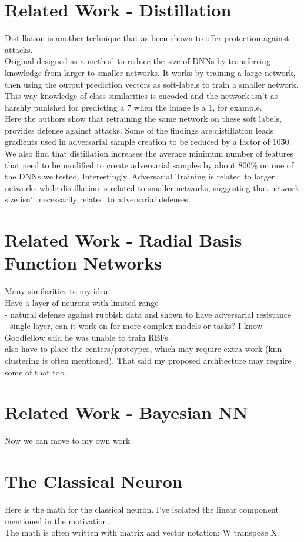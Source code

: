 \documentclass{article}
\begin{document}
\section{Related Work - Distillation}
Distillation is another technique that as been shown to offer protection against attacks.\\
Original designed as a method to reduce the size of DNNs by transferring knowledge from larger to smaller networks. It works by training a large network, then using the output prediction vectors as soft-labels to train a smaller network. This way knowledge of class similarities is encoded and the network isn't as harshly punished for predicting a 7 when the image is a  1, for example.\\
Here the authors show that retraining the same network on these soft labels, provides defense against attacks. Some of the findings are:distillation leads gradients used in adversarial sample creation to be reduced by a factor of
10\^30. We also find that distillation increases the average minimum
number of features that need to be modified to create adversarial
samples by about 800\% on one of the DNNs we tested.
Interestingly, Adversarial Training is related to larger networks while distillation is related to smaller networks, suggesting that network size isn't necessarily related to adversarial defenses.

\section{Related Work - Radial Basis Function Networks}
Many similarities to my idea:\\
Have a layer of neurons with limited range\\
 - natural defense against rubbish data and shown to have adversarial resistance\\
 - single layer, can it work on for more complex models or tasks? I know Goodfellow said he was unable to train RBFs.\\
 also have to place the centers/protoypes, which may require extra work (knn-clustering is often mentioned). That said my proposed architecture may require some of that too. 

\section{Related Work - Bayesian NN}


Now we can move to my own work

\section{The Classical Neuron}
Here is the math for the classical neuron. I've isolated the linear component mentioned in the motivation.\\
The math is often written with matrix and vector notation: W transpose X.
\end{document}
